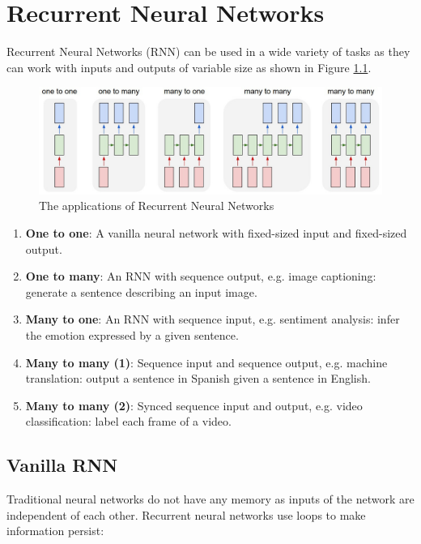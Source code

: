\chapter{Recurrent Neural Networks}

Recurrent Neural Networks (RNN) can be used in a wide variety of tasks as they can work with inputs and outputs of variable size as shown in Figure \ref{rnn-applications}.
\begin{figure}[H]
    \centering
    \includegraphics[width=\textwidth]{Images/rnn.jpeg}
    \caption{The applications of Recurrent Neural Networks \cite{unres-rnn}}
    \label{rnn-applications}
\end{figure}

\begin{enumerate}
     \itemsep0em
     \item \textbf{One to one}: A vanilla neural network with fixed-sized input and fixed-sized output.
     \item \textbf{One to many}: An RNN with sequence output, e.g. image captioning: generate a sentence describing an input image.
     \item \textbf{Many to one}: An RNN with sequence input, e.g. sentiment analysis: infer the emotion expressed by a given sentence.
     \item \textbf{Many to many (1)}: Sequence input and sequence output, e.g. machine translation: output a sentence in Spanish given a sentence in English.
     \item \textbf{Many to many (2)}: Synced sequence input and output, e.g. video classification: label each frame of a video.
\end{enumerate}

\section{Vanilla RNN}
Traditional neural networks do not have any memory as inputs of the network are independent of each other. Recurrent neural networks use loops to make information persist:

